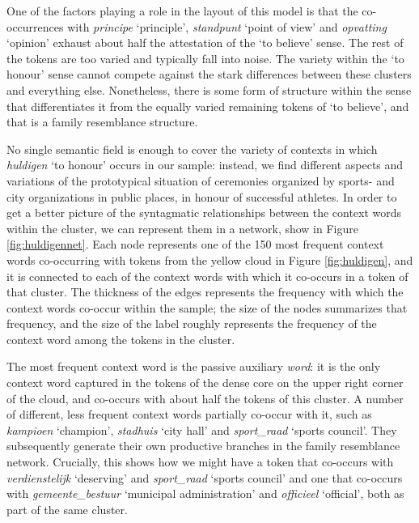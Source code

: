 \documentclass[
]{book}
\begin{document}
One of the factors playing a role in the layout of this model is that the co-occurrences with \emph{principe} `principle', \emph{standpunt} `point of view' and \emph{opvatting} `opinion' exhaust about half the attestation of the `to believe' sense. The rest of the tokens are too varied and typically fall into noise. The variety within the `to honour' sense cannot compete against the stark differences between these clusters and everything else. Nonetheless, there is some form of structure within the sense that differentiates it from the equally varied remaining tokens of `to believe', and that is a family resemblance structure.

No single semantic field is enough to cover the variety of contexts in which \emph{huldigen} `to honour' occurs in our sample: instead, we find different aspects and variations of the prototypical situation of ceremonies organized by sports- and city organizations in public places, in honour of successful athletes.
In order to get a better picture of the syntagmatic relationships between the context words within the cluster, we can represent them in a network, show in Figure \ref{fig:huldigennet}. Each node represents one of the 150 most frequent context words co-occurring with tokens from the yellow cloud in Figure \ref{fig:huldigen}, and it is connected to each of the context words with which it co-occurs in a token of that cluster. The thickness of the edges represents the frequency with which the context words co-occur within the sample; the size of the nodes summarizes that frequency, and the size of the label roughly represents the frequency of the context word among the tokens in the cluster.

The most frequent context word is the passive auxiliary \emph{word}: it is the only context word captured in the tokens of the dense core on the upper right corner of the cloud, and co-occurs with about half the tokens of this cluster. A number of different, less frequent context words partially co-occur with it, such as \emph{kampioen} `champion', \emph{stadhuis} `city hall' and \emph{sport\_raad} `sports council'. They subsequently generate their own productive branches in the family resemblance network. Crucially, this shows how we might have a token that co-occurs with \emph{verdienstelijk} `deserving' and \emph{sport\_raad} `sports council' and one that co-occurs with \emph{gemeente\_bestuur} `municipal administration' and \emph{officieel} `official', both as part of the same cluster.
\end{document}
